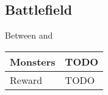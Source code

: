 \subsection{Battlefield}
\label{map:battlefield_07}

Between  and 

\noindent\begin{tabularx}{\textwidth}[l]{lX}
	Monsters
	& TODO
\\ \hline
	Reward & TODO
\end{tabularx}
